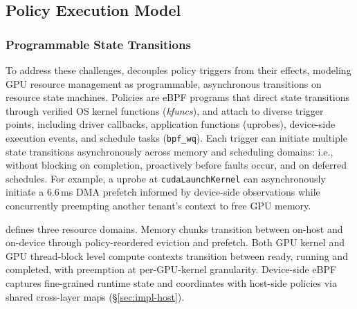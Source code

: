 \subsection{\sys{} Policy Execution Model}
\label{sec:design-interfaces}


\subsubsection{Programmable State Transitions}

To address these challenges, \sys{} decouples policy triggers from their effects, modeling GPU resource management as programmable, asynchronous transitions on resource state machines. Policies are eBPF programs that direct state transitions through verified OS kernel functions (\emph{kfuncs}), and attach to diverse trigger points, including driver callbacks, application functions (uprobes), device-side execution events, and schedule tasks (\texttt{bpf\_wq}). Each trigger can initiate multiple state transitions asynchronously across memory and scheduling domains: i.e., without blocking on completion, proactively before faults occur, and on deferred schedules. For example, a uprobe at \texttt{cudaLaunchKernel} can asynchronously initiate a 6.6\,ms DMA prefetch informed by device-side observations while concurrently preempting another tenant's context to free GPU memory.

\sys defines three resource domains. Memory chunks transition between on-host and on-device through policy-reordered eviction and prefetch. Both GPU kernel and GPU thread-block level compute contexts transition between ready, running and completed, with preemption at per-GPU-kernel granularity. Device-side eBPF captures fine-grained runtime state and coordinates with host-side policies via shared cross-layer maps (\S\ref{sec:impl-host}).


